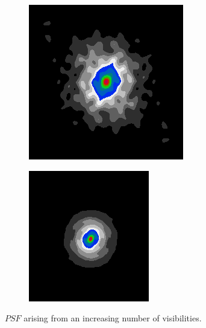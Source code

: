 \begin{figure}[h]
	\centering
	\begin{subfigure}[b]{0.4\linewidth}
		\includegraphics[width=\linewidth]{./chapters/03.distribution/simulated/psf.png}
	\end{subfigure}
	\begin{subfigure}[b]{0.4\linewidth}
		\includegraphics[width=\linewidth]{./chapters/06.gradient/psf_cut.png}
	\end{subfigure}
	
	\caption{$PSF$ arising from an increasing number of visibilities.}
\end{figure} 

